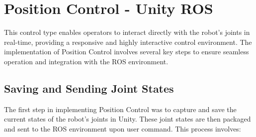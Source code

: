     \section{Position Control - Unity ROS}
    This control type enables operators to interact directly with the robot's joints in real-time, providing a responsive and highly interactive control environment. The implementation of Position Control involves several key steps to ensure seamless operation and integration with the ROS environment.
    
    \subsection{Saving and Sending Joint States}
    The first step in implementing Position Control was to capture and save the current states of the robot's joints in Unity. These joint states are then packaged and sent to the ROS environment upon user command. This process involves:
